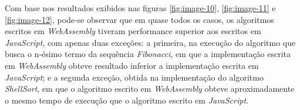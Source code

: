 \begin{figure}[h!]
    \centering
\end{figure}

\begin{figure}[h!]
    \centering
\end{figure}

\begin{figure}[h!]
    \centering
\end{figure}

Com base nos resultados exibidos nas figuras \ref{fig:image-10}, \ref{fig:image-11} e
\ref{fig:image-12}, pode-se observar que em quase todos os casos, os algoritmos escritos
em \textit{WebAssembly} tiveram performance superior aos escritos em \textit{JavaScript},
com apenas duas exceções: a primeira, na execução do algoritmo que busca o n-ésimo termo
da sequência \textit{Fibonacci}, em que a implementação escrita em \textit{WebAssembly}
obteve resultado inferior a implementação escrita em \textit{JavaScript}; e a segunda
exceção, obtida na implementação do algoritmo \textit{ShellSort}, em que o algoritmo
escrito em \textit{WebAssembly} obteve aproximadamente o mesmo tempo de execução que o
algoritmo escrito em \textit{JavaScript}.

